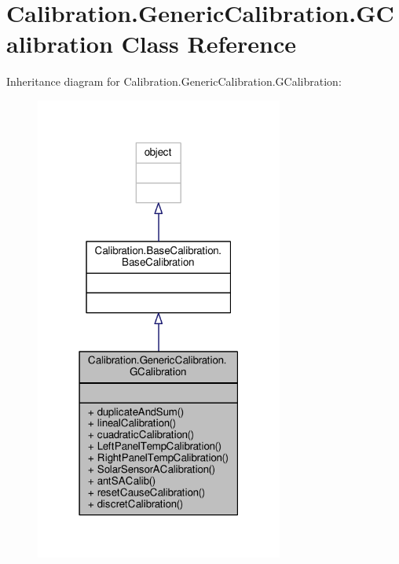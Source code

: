 \hypertarget{class_calibration_1_1_generic_calibration_1_1_g_calibration}{}\section{Calibration.\+Generic\+Calibration.\+G\+Calibration Class Reference}
\label{class_calibration_1_1_generic_calibration_1_1_g_calibration}


Inheritance diagram for Calibration.\+Generic\+Calibration.\+G\+Calibration\+:\nopagebreak
\begin{figure}[H]
\begin{center}
\leavevmode
\includegraphics[width=231pt]{class_calibration_1_1_generic_calibration_1_1_g_calibration__inherit__graph}
\end{center}
\end{figure}


